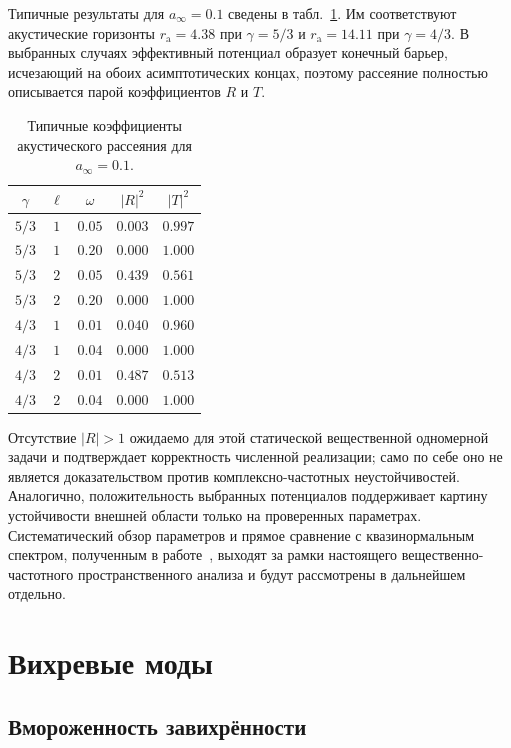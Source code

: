 \documentclass[12pt,a4paper,preprint,nopreprintline]{elsarticle}
\begin{document}
Типичные результаты для $a_{\infty}=0.1$ сведены в табл.~\ref{tab:acoustic_scattering}. Им соответствуют акустические горизонты $r_{\mathrm{a}}=4.38$ при $\gamma=5/3$ и $r_{\mathrm{a}}=14.11$ при $\gamma=4/3$. В выбранных случаях эффективный потенциал образует конечный барьер, исчезающий на обоих асимптотических концах, поэтому рассеяние полностью описывается парой коэффициентов $R$ и $T$.
\begin{table}[ht]
\centering
\caption{Типичные коэффициенты акустического рассеяния для
$a_{\infty}=0.1$.}
\label{tab:acoustic_scattering}
\begin{tabular}{ccccc}
\toprule
$\gamma$ & $\ell$ & $\omega$ & $|R|^{2}$ & $|T|^{2}$ \\
\midrule
$5/3$ & $1$ & $0.05$ & $0.003$ & $0.997$ \\
$5/3$ & $1$ & $0.20$ & $0.000$ & $1.000$ \\
$5/3$ & $2$ & $0.05$ & $0.439$ & $0.561$ \\
$5/3$ & $2$ & $0.20$ & $0.000$ & $1.000$ \\
$4/3$ & $1$ & $0.01$ & $0.040$ & $0.960$ \\
$4/3$ & $1$ & $0.04$ & $0.000$ & $1.000$ \\
$4/3$ & $2$ & $0.01$ & $0.487$ & $0.513$ \\
$4/3$ & $2$ & $0.04$ & $0.000$ & $1.000$ \\
\bottomrule
\end{tabular}
\end{table}

Отсутствие $|R|>1$ ожидаемо для этой статической вещественной одномерной задачи и подтверждает корректность численной реализации; само по себе оно не является доказательством против комплексно-частотных неустойчивостей. Аналогично, положительность выбранных потенциалов поддерживает картину устойчивости внешней области только на проверенных параметрах. Систематический обзор параметров и прямое сравнение с квазинормальным спектром, полученным в работе~\cite{ChaverraE_MoralesMD_SarbachO_QuasinormalAcousticOscillationsInTheMichelFlow_2015}, выходят за рамки настоящего вещественно-частотного пространственного анализа и будут рассмотрены в дальнейшем отдельно.

\section{Вихревые моды}
\label{sec:vortical}

\subsection{Вмороженность завихрённости}
\label{sec:frozen_vorticity}
\end{document}
